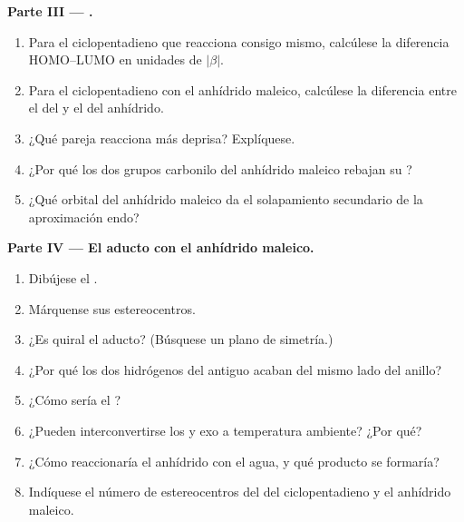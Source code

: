 \begin{problem}
\medskip
\noindent\textbf{Parte III --- .}
\begin{enumerate}[resume]
  \item Para el ciclopentadieno que reacciona consigo mismo, calcúlese la diferencia HOMO--LUMO en unidades de
        $|\beta|$.
  \item Para el ciclopentadieno con el anhídrido maleico, calcúlese la diferencia entre el  del 
        y el  del anhídrido.
  \item ¿Qué pareja reacciona más deprisa? Explíquese.
  \item ¿Por qué los dos grupos carbonilo del anhídrido maleico rebajan su ?
  \item ¿Qué orbital del anhídrido maleico da el solapamiento secundario de la aproximación
        endo?
\end{enumerate}

\medskip
\noindent\textbf{Parte IV --- El aducto con el anhídrido maleico.}
\begin{enumerate}[resume]
  \item Dibújese el .
  \item Márquense sus estereocentros.
  \item ¿Es quiral el aducto? (Búsquese un plano de simetría.)
  \item ¿Por qué los dos hidrógenos del antiguo  acaban del mismo lado del
        anillo?
  \item ¿Cómo sería el ?
  \item ¿Pueden interconvertirse los  y exo a temperatura ambiente? ¿Por qué?
  \item ¿Cómo reaccionaría el anhídrido con el agua, y qué producto se formaría?
  \item Indíquese el número de estereocentros del  del ciclopentadieno y el
        anhídrido maleico.
\end{enumerate}
\end{problem}
